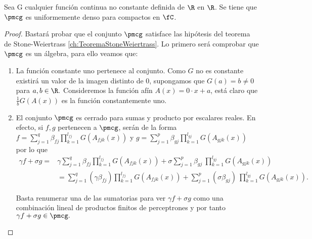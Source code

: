 \begin{teorema}   \label{teo:TeoremaConvergenciaRealEnCompactosDefinicionesEsenciales}

    Sea G cualquier función continua no constante definida de $\R$ en $\R$. 
    Se tiene que $\pmcg$ es uniformemente denso para compactos en $\fC$.
\end{teorema}

\begin{proof}
    Bastará probar que el conjunto $\pmcg$ satisface las hipótesis del teorema de
     Stone-Weiertrass \ref{ch:TeoremaStoneWeiertrass}.
    Lo primero será comprobar que $\pmcg$ es un álgebra, para ello veamos que:         
    \begin{enumerate}
        \item La función constante uno pertenece al conjunto. 
        Como $G$ no es constante existirá un valor de la imagen distinto de $0$, supongamos que $G(a)= b \neq 0$ para $a,b \in \R.$
        Consideremos la función afín $A(x) = 0 \cdot x + a$, está claro que $\frac{1}{b}G(A(x))$ es la función constantemente uno. 
        \item El conjunto $\pmcg$ es cerrado para sumas y producto por escalares reales. 
        En efecto, si $f,g$ pertenecen a  $\pmcg$, serán de la forma
         $f = \sum_{j = 1} ^q  \beta_{fj} \prod_{k=1}^{l_{fj}}  G(A_{fjk}(x))$ y 
        $g = \sum_{j = 1} ^p  \beta_{gj} \prod_{k=1}^{l_{gj}}G(A_{gjk}(x))$  por lo que
        \begin{equation}
            \begin{split}
                \gamma f+ \sigma g =& \gamma \sum_{j = 1} ^q  \beta_{fj} \prod_{k=1}^{l_{fj}}  G(A_{fjk}(x)) + 
                \sigma \sum_{j = 1} ^p  \beta_{gj} \ \prod_{k=1}^{l_{gj}}G(A_{gjk}(x)) \\
                & = \sum_{j = 1} ^q  (\gamma \beta_{fj})  \prod_{k=1}^{l_{fj}}  G(A_{fjk}(x)) + 
                \sum_{j = 1} ^p  (\sigma \beta_{gj}) \ \prod_{k=1}^{l_{gj}}G(A_{gjk}(x)).
            \end{split}
        \end{equation}
        
        Basta renumerar una de las sumatorias para ver $\gamma f+ \sigma g$ como una combinación 
        lineal de productos finitos de perceptrones y por tanto $\gamma f+ \sigma g \in \pmcg.$
        

\end{enumerate}
\end{proof}
